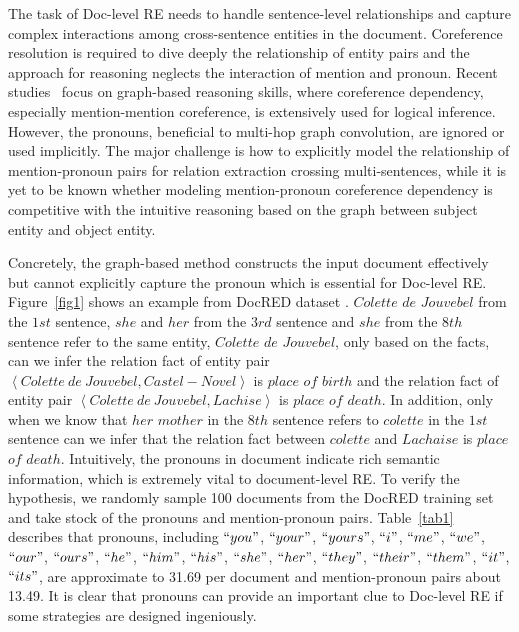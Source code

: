 \documentclass{article}
\begin{document}
The task of Doc-level RE needs to handle sentence-level relationships and capture complex interactions among cross-sentence entities in the document. Coreference resolution is required to dive deeply the relationship of entity pairs and the approach for reasoning neglects the interaction of mention and pronoun. Recent studies~\cite{ye2020coreferential,xu2021discriminative,huang2021graph} focus on graph-based reasoning skills, where coreference dependency, especially mention-mention coreference, is extensively used for logical inference. However, the pronouns, beneficial to multi-hop graph convolution, are ignored or used implicitly. The major challenge is how to explicitly model the relationship of mention-pronoun pairs for relation extraction crossing multi-sentences, while it is yet to be known whether modeling mention-pronoun coreference dependency is competitive with the intuitive reasoning based on the graph between subject entity and object entity.

Concretely, the graph-based method constructs the input document effectively but cannot explicitly capture the pronoun which is essential for Doc-level RE. Figure~\ref{fig1} shows an example from DocRED dataset \cite{yao2019docred}. $Colette$ $de$ $Jouvebel$ from the $1st$ sentence, $she$ and $her$ from the $3rd$ sentence and $she$ from the $8th$ sentence refer to the same entity, $Colette$ $de$ $Jouvebel$, only based on the facts, can we infer the relation fact of entity pair $\left< Colette~de~Jouvebel, Castel- Novel \right>$ is $place$ $of$ $birth$ and the relation fact of entity pair $\left< Colette~de~Jouvebel, Lachise \right>$ is $place$ $of$ $death$. In addition, only when we know that $her$ $mother$ in the $8th$ sentence refers to $colette$ in the $1st$ sentence can we infer that the relation fact between $colette$ and $Lachaise$ is $place$ $of$ $death$. Intuitively, the pronouns in document indicate rich semantic information, which is extremely vital to document-level RE. To verify the hypothesis, we randomly sample 100 documents from the DocRED training set and take stock of the pronouns and mention-pronoun pairs. Table~\ref{tab1} describes that pronouns, including $``you"$, $``your"$, $``yours"$, $``i"$, $``me"$, $``we"$, $``our"$, $``ours"$, $``he"$, $``him"$, $``his"$, $``she"$, $``her"$, $``they"$, $``their"$, $``them"$, $``it"$, $``its"$, are approximate to 31.69 per document and mention-pronoun pairs about 13.49. It is clear that pronouns can provide an important clue to Doc-level RE if some strategies are designed ingeniously.
\end{document}
